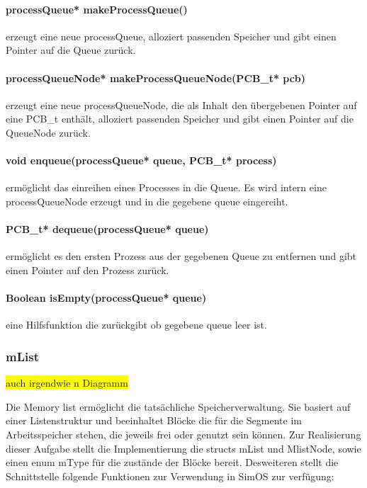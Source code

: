 \paragraph{processQueue* makeProcessQueue()} erzeugt eine neue processQueue, alloziert passenden Speicher und gibt einen Pointer auf die Queue zurück.

\paragraph{processQueueNode* makeProcessQueueNode(PCB\_t* pcb)} erzeugt eine neue processQueueNode, die als Inhalt den übergebenen Pointer auf eine PCB\_t enthält, alloziert passenden Speicher und gibt einen Pointer auf die QueueNode zurück.

\paragraph{void enqueue(processQueue* queue, PCB\_t* process)} ermöglicht das einreihen eines Processes in die Queue. Es wird intern eine processQueueNode erzeugt und in die gegebene queue eingereiht.

\paragraph{PCB\_t* dequeue(processQueue* queue)} ermöglicht es den ersten Prozess aus der gegebenen Queue zu entfernen und gibt einen Pointer auf den Prozess zurück.

\paragraph{Boolean isEmpty(processQueue* queue)} eine Hilfsfunktion die zurückgibt ob gegebene queue leer ist.


\subsubsection{mList}
\colorbox{yellow}{auch irgendwie n Diagramm}

Die Memory list ermöglicht die tatsächliche Speicherverwaltung. Sie basiert auf einer Listenstruktur und beeinhaltet Blöcke die für die Segmente im Arbeitsspeicher stehen, die jeweils frei oder genutzt sein können.
Zur Realisierung dieser Aufgabe stellt die Implementierung die structs mList und MlistNode, sowie einen enum mType für die zustände der Blöcke bereit.
Desweiteren stellt die Schnittstelle folgende Funktionen zur Verwendung in SimOS zur verfügung:

